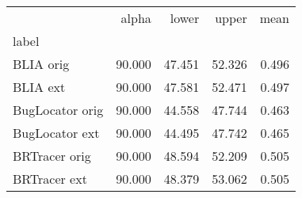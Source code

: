 \begin{tabular}{lrrrr}
\toprule
{} &  alpha &  lower &  upper &  mean \\
label           &        &        &        &       \\
\midrule
BLIA orig       & 90.000 & 47.451 & 52.326 & 0.496 \\
BLIA ext        & 90.000 & 47.581 & 52.471 & 0.497 \\
BugLocator orig & 90.000 & 44.558 & 47.744 & 0.463 \\
BugLocator ext  & 90.000 & 44.495 & 47.742 & 0.465 \\
BRTracer orig   & 90.000 & 48.594 & 52.209 & 0.505 \\
BRTracer ext    & 90.000 & 48.379 & 53.062 & 0.505 \\
\bottomrule
\end{tabular}
